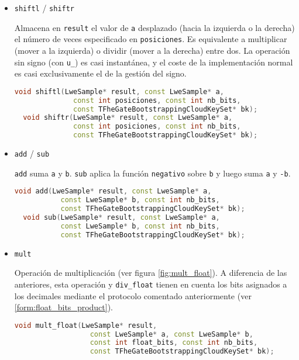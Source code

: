\begin{itemize}
  \item \texttt{shiftl} / \texttt{shiftr}

  Almacena en \verb|result| el valor de \verb|a| desplazado (hacia la izquierda o la derecha) el número de veces especificado en \verb|posiciones|. Es equivalente a multiplicar (mover a la izquierda) o dividir (mover a la derecha) entre dos. La operación sin signo (con \verb|u_|) es casi instantánea, y el coste de la implementación normal es casi exclusivamente el de la gestión del signo.

  \begin{lstlisting}[language=c++]
  void shiftl(LweSample* result, const LweSample* a,
              const int posiciones, const int nb_bits,
              const TFheGateBootstrappingCloudKeySet* bk);
  void shiftr(LweSample* result, const LweSample* a,
              const int posiciones, const int nb_bits,
              const TFheGateBootstrappingCloudKeySet* bk);
  \end{lstlisting}

  \item \texttt{add} / \texttt{sub}

  \verb|add| suma \verb|a| y \verb|b|. \verb|sub| aplica la función \verb|negativo| sobre \verb|b| y luego suma \verb|a| y \verb|-b|.

  \begin{lstlisting}[language=c++]
  void add(LweSample* result, const LweSample* a,
           const LweSample* b, const int nb_bits,
           const TFheGateBootstrappingCloudKeySet* bk);
  void sub(LweSample* result, const LweSample* a,
           const LweSample* b, const int nb_bits,
           const TFheGateBootstrappingCloudKeySet* bk);
  \end{lstlisting}

  \item \texttt{mult}

  Operación de multiplicación (ver figura \ref{fig:mult_float}). A diferencia de las anteriores, esta operación y \verb|div_float| tienen en cuenta los bits asignados a los decimales mediante el protocolo comentado anteriormente (ver \ref{form:float_bits_product}).

  \begin{lstlisting}[language=c++]
  void mult_float(LweSample* result,
                  const LweSample* a, const LweSample* b,
                  const int float_bits, const int nb_bits,
                  const TFheGateBootstrappingCloudKeySet* bk);
  \end{lstlisting}


\end{itemize}
